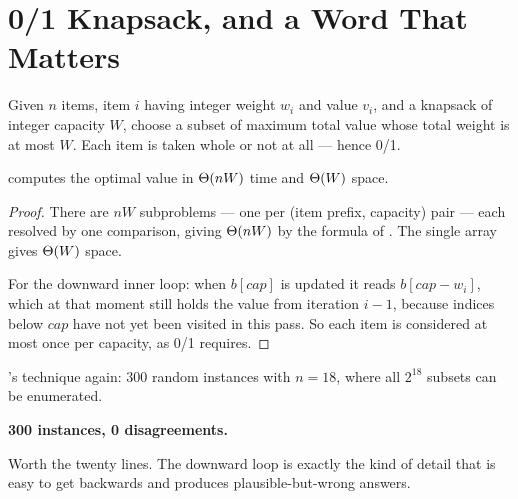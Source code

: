 \section{0/1 Knapsack, and a Word That Matters}

\begin{definitionbox}[0/1 Knapsack]
Given $n$ items, item $i$ having integer weight $w_{i}$ and value $v_{i}$, and
a knapsack of integer capacity $W$, choose a subset of maximum total value
whose total weight is at most $W$. Each item is taken whole or not at all ---
hence 0/1.
\end{definitionbox}


\begin{theorem}[Knapsack]\label{thm:knapsack}
 computes the optimal value in $\Theta(nW)$ time and
$\Theta(W)$ space.
\end{theorem}

\begin{proof}
There are $nW$ subproblems --- one per (item prefix, capacity) pair --- each
resolved by one comparison, giving $\Theta(nW)$ by the formula of
. The single array gives $\Theta(W)$ space.

\smallskip
For the downward inner loop: when $b[\mathit{cap}]$ is updated it reads
$b[\mathit{cap}-w_{i}]$, which at that moment still holds the value from
iteration $i-1$, because indices below $\mathit{cap}$ have not yet been visited
in this pass. So each item is considered at most once per capacity, as 0/1
requires.
\end{proof}

\begin{worked}
's technique again: 300 random instances with $n = 18$, where
all $2^{18}$ subsets can be enumerated.
\begin{center}
\textbf{300 instances, 0 disagreements.}
\end{center}
Worth the twenty lines. The downward loop is exactly the kind of detail that is
easy to get backwards and produces plausible-but-wrong answers.
\end{worked}


